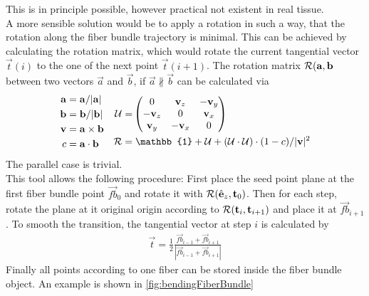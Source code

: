 This is in principle possible, however practical not existent in real tissue.
\\
A more sensible solution would be to apply a rotation in such a way, that the rotation along the fiber bundle trajectory is minimal.
This can be achieved by calculating the rotation matrix, which would rotate the current tangential vector $\vec{t}(i)$ to the one of the next point $\vec{t}(i+1)$.
The rotation matrix $\mathcal{R}(\mathbf{a}, \mathbf{b}$ between two vectors $\vec{a}$ and $\vec{b}$, if $\vec{a} \nparallel \vec{b}$ can be calculated via
\begin{align}
\begin{split}
    \vec{a} =& \; \vec{a} / |\vec{a}|\\
    \vec{b} =& \; \vec{b} / |\vec{b}|\\
    \vec{v} =& \; \vec{a} \times \vec{b}\\
    c =& \; \vec{a} \cdot \vec{b}
\end{split}
\quad
\begin{split}
    \mat{U} =& \begin{pmatrix} 0 & \vec{v}_z & -\vec{v}_y\\ -\vec{v}_z & 0 & \vec{v}_x\\ \vec{v}_y & -\vec{v}_x & 0\end{pmatrix}\\
    \mat{R} =& \; \mathbb{1} + \mat{U} + (\mat{U} \cdot \mat{U}) \cdot (1 - c) / |\vec{v}|^2
\end{split}
\end{align}
The parallel case is trivial.
\\
This tool allows the following procedure:
First place the seed point plane at the first fiber bundle point $\vec{fb}_0$ and rotate it with $\mathcal{R}(\hat{\mathbf{e}}_z, \mathbf{t}_0)$.
Then for each step, rotate the plane at it original origin according to $\mathcal{R}(\mathbf{t}_i, \mathbf{t}_{i+1})$ and place it at $\vec{fb}_{i+1}$.
To smooth the transition, the tangential vector at step $i$ is calculated by
\begin{align}
    \vec{t} = \frac{1}{2} \frac{\vec{fb}_{i-1} + \vec{fb}_{i+1}}{|\vec{fb}_{i-1} + \vec{fb}_{i+1}|}
\end{align}
%
Finally all points according to one fiber can be stored inside the fiber bundle object.
An example is shown in \cref{fig:bendingFiberBundle}
%
%
%
